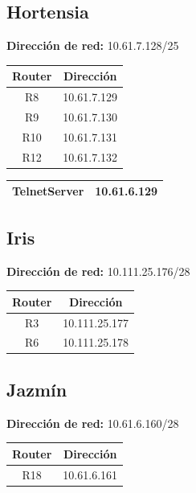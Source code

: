 \subsection{Hortensia}
\textbf{Dirección de red:} 10.61.7.128/25
\begin{table}[!htbp]
\centering
  \begin{tabular}{|c|c|}
    \hline
	Router & Dirección\\ \hline
	R8 & 10.61.7.129\\ \hline
	R9 & 10.61.7.130\\ \hline
	R10 & 10.61.7.131\\ \hline
	R12 & 10.61.7.132\\
    \hline
  \end{tabular}
\end{table}

\begin{table}[!htbp]
\centering
  \begin{tabular}{|c|c|}
    \hline
	TelnetServer& 10.61.6.129 \\
    \hline
  \end{tabular}
\end{table}

\subsection{Iris}
\textbf{Dirección de red:} 10.111.25.176/28
\begin{table}[!htbp]
\centering
  \begin{tabular}{|c|c|}
    \hline
	Router & Dirección\\ \hline
	R3 & 10.111.25.177\\ \hline
	R6 & 10.111.25.178\\
    \hline
  \end{tabular}
\end{table}

\subsection{Jazmín}
\textbf{Dirección de red:} 10.61.6.160/28
\begin{table}[!htbp]
\centering
  \begin{tabular}{|c|c|}
    \hline
	Router & Dirección\\ \hline
	R18 & 10.61.6.161\\
    \hline
  \end{tabular}
\end{table}


